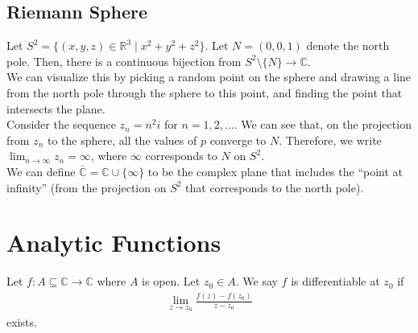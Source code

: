 \documentclass[10pt]{extarticle}
\newcommand{\R}{\mathbb{R}}
\newcommand{\C}{\mathbb{C}}
\begin{document}
  \subsection{Riemann Sphere}%
  Let $S^2 = \{(x,y,z)\in \R^3\mid x^2 + y^2 + z^2\}$. Let $N = (0,0,1)$ denote the north pole. Then, there is a continuous bijection from $S^2 \setminus \{N\} \rightarrow \C$.\\

  We can visualize this by picking a random point on the sphere and drawing a line from the north pole through the sphere to this point, and finding the point that intersects the plane.\\

  Consider the sequence $z_n = n^2 i$ for $n=1,2,\dots$. We can see that, on the projection from $z_n$ to the sphere, all the values of $p$ converge to $N$. Therefore, we write $\lim_{n\rightarrow\infty}z_n = \infty$, where $\infty$ corresponds to $N$ on $S^2$.\\

  We can define $\overline{\C} = \C\cup \{\infty\}$ to be the complex plane that includes the ``point at infinity'' (from the projection on $S^2$ that corresponds to the north pole).
  \section{Analytic Functions}%
  Let $f: A\subseteq \C \rightarrow \C$ where $A$ is open. Let $z_0\in A$. We say $f$ is differentiable at $z_0$ if
  \begin{align*}
    \lim_{z\rightarrow z_0}\frac{f(z)-f(z_0)}{z-z_0}
  \end{align*}
  exists.
\end{document}
